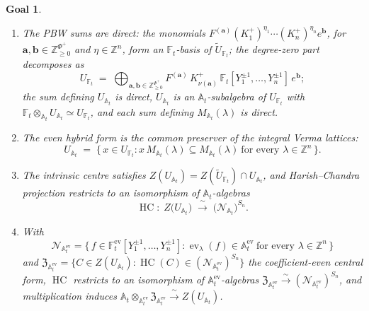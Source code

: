 \documentclass[11pt]{article}
\newtheorem*{goal}{Goal}
\newcommand{\At}{\mathbb A_t}
\newcommand{\Atev}{\mathbb A_t^{\mathrm{ev}}}
\newcommand{\Ft}{\mathbb F_t}
\newcommand{\Ftev}{\mathbb F_t^{\mathrm{ev}}}
\newcommand{\Nat}{\mathcal N_{\mathbb A_t}}
\newcommand{\Natev}{\mathcal N_{\mathbb A_t^{\mathrm{ev}}}}
\newcommand{\HC}{\operatorname{HC}}
\newcommand{\ev}{\operatorname{ev}}
\begin{document}
\begin{goal}\begin{enumerate}
  \item[(i)] The PBW sums are direct: the monomials
  $F^{(\mathbf a)}(K_1^{+})^{\eta_1}\cdots(K_n^{+})^{\eta_n}e^{\mathbf b}$,
  for $\mathbf a,\mathbf b\in\mathbb Z_{\ge0}^{\Phi^{+}}$ and
  $\eta\in\mathbb Z^{n}$, form an $\Ft$-basis of $\widetilde U_{\Ft}$; the
  degree-zero part decomposes as
  \[
    U_{\Ft}\;=\;\bigoplus_{\mathbf a,\mathbf b\in\mathbb Z_{\ge0}^{\Phi^{+}}}
    F^{(\mathbf a)}\,K^{+}_{\nu(\mathbf a)}\,
    \Ft[Y_1^{\pm1},\ldots,Y_n^{\pm1}]\,e^{\mathbf b};
  \]
  the sum defining $U_{\At}$ is direct, $U_{\At}$ is an $\At$-subalgebra of
  $U_{\Ft}$ with $\Ft\otimes_{\At}U_{\At}\simeq U_{\Ft}$, and each sum
  defining $M_{\At}(\lambda)$ is direct.
  \item[(ii)] The even hybrid form is the common preserver of the integral
  Verma lattices:
  \[
    U_{\At}\;=\;\bigl\{\,x\in U_{\Ft}:
    x\,M_{\At}(\lambda)\subseteq M_{\At}(\lambda)\ \text{for every }
    \lambda\in\mathbb Z^{n}\,\bigr\}.
  \]
  \item[(iii)] The intrinsic centre satisfies
  $Z(U_{\At})=Z(\widetilde U_{\Ft})\cap U_{\At}$, and Harish--Chandra
  projection restricts to an isomorphism of $\At$-algebras
  \[
    \HC:\;Z\bigl(U_{\At}\bigr)\;\xrightarrow{\ \sim\ }\;
    \bigl(\Nat\bigr)^{S_n}.
  \]
  \item[(iv)] With
  \[
    \Natev=\bigl\{\,f\in\Ftev[Y_1^{\pm1},\ldots,Y_n^{\pm1}]:
    \ev_\lambda(f)\in\Atev\ \text{for every }\lambda\in\mathbb Z^{n}\,\bigr\}
  \]
  and $\mathfrak Z_{\Atev}=\{C\in Z(U_{\At}):\HC(C)\in(\Natev)^{S_n}\}$ the
  coefficient-even central form, $\HC$ restricts to an isomorphism of
  $\Atev$-algebras
  $\mathfrak Z_{\Atev}\xrightarrow{\ \sim\ }(\Natev)^{S_n}$, and
  multiplication induces
  $\At\otimes_{\Atev}\mathfrak Z_{\Atev}\xrightarrow{\ \sim\ }Z(U_{\At})$.
\end{enumerate}
\end{goal}
\end{document}
